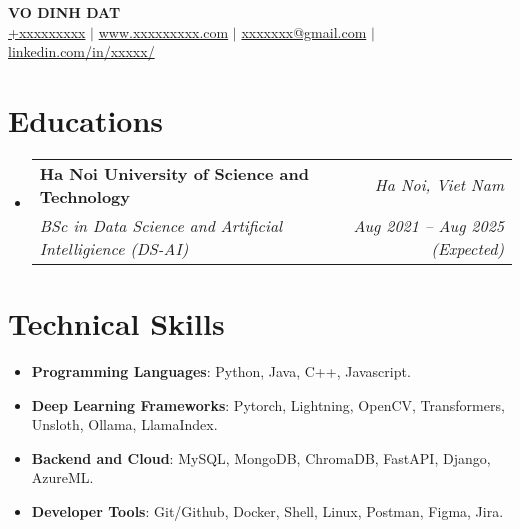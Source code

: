 \documentclass[letterpaper,11pt]{article}
\makeatletter
\newcommand{\resumeitem}[1]{
  \item\small{
    #1 \vspace{-2pt}
  }
}
\newcommand{\resumeSubheading}[4]{
  \vspace{-1pt}\item
    \begin{tabular*}{0.97\textwidth}[t]{l@{\extracolsep{\fill}}r}
      \textbf{#1} & \textit{#2} \\
      \textit{\small#3} & \textit{\small #4} \\
    \end{tabular*}\vspace{-6pt}
}
\newcommand{\resumeSubHeadingListStart}{\begin{itemize}[leftmargin=*,label={}]}
\newcommand{\resumeSubHeadingListEnd}{\end{itemize}}
\newcommand{\resumeItemListStart}{\begin{itemize}}
\newcommand{\resumeItemListEnd}{\end{itemize}\vspace{-5pt}}
\makeatother
\begin{document}

\begin{center}
  \textbf{\LARGE {VO DINH DAT}} \\ \vspace{1pt}
  \href{tel:+xxxxxxxxx}{{+xxxxxxxxx}} $|$ \href{https://xxxxxx.com}{{www.xxxxxxxxx.com}}
  $|$ \href{mailto:xxxxxxxx@gmail.com}{{xxxxxxx@gmail.com}} $|$ 
  \href{https://www.linkedin.com/in/xxxxxxx/}{{linkedin.com/in/xxxxx/}}
  
\end{center}

\section{Educations}
  \resumeSubHeadingListStart
    \resumeSubheading
      {Ha Noi University of Science and Technology}{\textit{Ha Noi, Viet Nam}}
      {BSc in Data Science and Artificial Intelligience (DS-AI)}{Aug 2021 -- Aug 2025 (Expected)}
  \resumeSubHeadingListEnd

  
  \section{Technical Skills}
  \resumeItemListStart[leftmargin=*,label={}]
    \resumeitem{\textbf{Programming Languages}: {Python, Java, C++, Javascript.}} \\[-\baselineskip]
    \resumeitem{\textbf{Deep Learning Frameworks}: {Pytorch, Lightning, OpenCV, Transformers, Unsloth, Ollama, LlamaIndex.}} \\[-\baselineskip]
    \resumeitem{\textbf{Backend and Cloud}: {MySQL, MongoDB, ChromaDB, FastAPI, Django, AzureML.}} \\[-\baselineskip]
    \resumeitem{\textbf{Developer Tools}: {Git/Github, Docker, Shell, Linux, Postman, Figma, Jira.}}\\[-\baselineskip]
  \resumeItemListEnd
  
\end{document}
